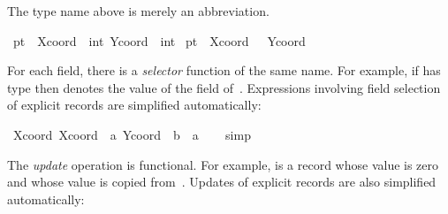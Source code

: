 \begin{isabellebody}
\begin{isamarkuptext}
  The type name above is merely an abbreviation.%
\end{isamarkuptext}%
\isamarkuptrue%
\isamarkupfalse%
\ pt{}\ {}{}\ {}{}Xcoord\ {}{}\ int{}\ Ycoord\ {}{}\ int{}{}\ \isanewline
{}pt{}\ {}\ {}Xcoord\ {}\ {}{}{}{}\ Ycoord\ {}\ {}{}{}{}%
\begin{isamarkuptext}%
For each field, there is a \emph{selector}
  function of the same name.  For example, if  has type  then  denotes the value of the  field of~.  Expressions involving field selection
  of explicit records are simplified automatically:%
\end{isamarkuptext}%
\isamarkuptrue%
\isamarkupfalse%
\ {}Xcoord\ {}Xcoord\ {}\ a{}\ Ycoord\ {}\ b{}\ {}\ a{}\isanewline
%
\isadelimproof
\ \ %
\endisadelimproof
%
\isatagproof
{}\isamarkupfalse%
\ simp%
\endisatagproof
{\isafoldproof}%
%
\isadelimproof
%
\endisadelimproof
%
\begin{isamarkuptext}%
The \emph{update} operation is functional.  For
  example,  is a record whose 
  value is zero and whose  value is copied from~.  Updates of explicit records are also simplified automatically:%
\end{isamarkuptext}%

\end{isabellebody}
